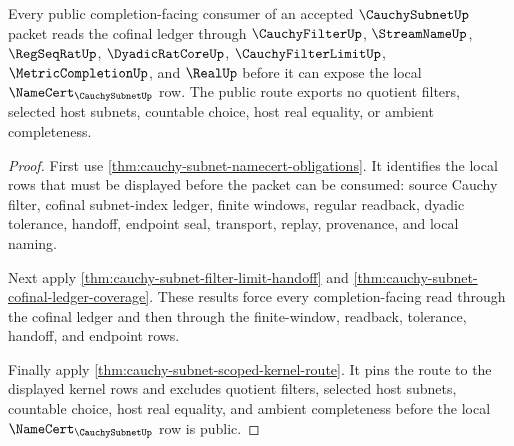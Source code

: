 \begin{theorem}
\label{thm:cauchysubnet-public-certificate-route}
Every public completion-facing consumer of an accepted $\CauchySubnetUp$ packet reads the cofinal ledger through $\CauchyFilterUp$, $\StreamNameUp$, $\RegSeqRatUp$, $\DyadicRatCoreUp$, $\CauchyFilterLimitUp$, $\MetricCompletionUp$, and $\RealUp$ before it can expose the local $\NameCert_{\CauchySubnetUp}$ row. The public route exports no quotient filters, selected host subnets, countable choice, host real equality, or ambient completeness.
\end{theorem}
\begin{proof}
First use \autoref{thm:cauchy-subnet-namecert-obligations}. It identifies the local rows that must be displayed before the packet can be consumed: source Cauchy filter, cofinal subnet-index ledger, finite windows, regular readback, dyadic tolerance, handoff, endpoint seal, transport, replay, provenance, and local naming.

Next apply \autoref{thm:cauchy-subnet-filter-limit-handoff} and \autoref{thm:cauchy-subnet-cofinal-ledger-coverage}. These results force every completion-facing read through the cofinal ledger and then through the finite-window, readback, tolerance, handoff, and endpoint rows.

Finally apply \autoref{thm:cauchy-subnet-scoped-kernel-route}. It pins the route to the displayed kernel rows and excludes quotient filters, selected host subnets, countable choice, host real equality, and ambient completeness before the local $\NameCert_{\CauchySubnetUp}$ row is public.
\end{proof}

